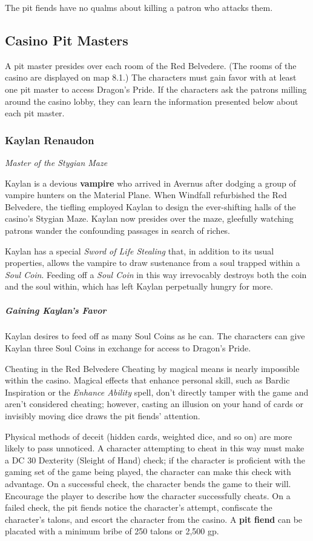 \documentclass[10pt,a4paper,twoside,bg=print,twocolumn,openany,nodeprecatedcode]{dndbook}
\begin{document}
The pit fiends have no qualms about killing a patron who attacks them.

\subsection{Casino Pit Masters}
A pit master presides over each room of the Red Belvedere. (The rooms of the casino are displayed on map 8.1.) The characters must gain favor with at least one pit master to access Dragon's Pride. If the characters ask the patrons milling around the casino lobby, they can learn the information presented below about each pit master.

\subsubsection{Kaylan Renaudon}
\textit{Master of the Stygian Maze}

Kaylan is a devious \textbf{vampire} who arrived in Avernus after dodging a group of vampire hunters on the Material Plane. When Windfall refurbished the Red Belvedere, the tiefling employed Kaylan to design the ever-shifting halls of the casino's Stygian Maze. Kaylan now presides over the maze, gleefully watching patrons wander the confounding passages in search of riches.

Kaylan has a special \textit{Sword of Life Stealing} that, in addition to its usual properties, allows the vampire to draw sustenance from a soul trapped within a \textit{Soul Coin}. Feeding off a \textit{Soul Coin} in this way irrevocably destroys both the coin and the soul within, which has left Kaylan perpetually hungry for more.

\subparagraph{Gaining Kaylan's Favor}
Kaylan desires to feed off as many Soul Coins as he can. The characters can give Kaylan three Soul Coins in exchange for access to Dragon's Pride.

\begin{DndSidebar}[float=!b]{Cheating in the Red Belvedere}
Cheating by magical means is nearly impossible within the casino. Magical effects that enhance personal skill, such as Bardic Inspiration or the \textit{Enhance Ability} spell, don't directly tamper with the game and aren't considered cheating; however, casting an illusion on your hand of cards or invisibly moving dice draws the pit fiends' attention.



Physical methods of deceit (hidden cards, weighted dice, and so on) are more likely to pass unnoticed. A character attempting to cheat in this way must make a DC 30 Dexterity (Sleight of Hand) check; if the character is proficient with the gaming set of the game being played, the character can make this check with advantage. On a successful check, the character bends the game to their will. Encourage the player to describe how the character successfully cheats. On a failed check, the pit fiends notice the character's attempt, confiscate the character's talons, and escort the character from the casino. A \textbf{pit fiend} can be placated with a minimum bribe of 250 talons or 2,500 gp.



\end{DndSidebar}
\end{document}
